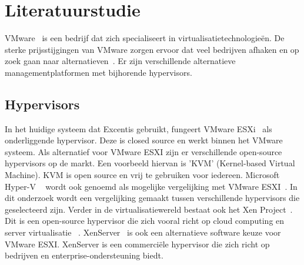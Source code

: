 




\section{Literatuurstudie}
\label{sec:literatuurstudie}
VMware~\autocite{vmware} is een bedrijf dat zich specialiseert in virtualisatietechnologieën. De sterke prijsstijgingen van VMware zorgen ervoor dat veel bedrijven afhaken en op zoek gaan naar alternatieven~\autocite{Hale2024}. Er zijn verschillende alternatieve managementplatformen met bijhorende hypervisors.

\subsection{Hypervisors}
In het huidige systeem dat Excentis gebruikt, fungeert VMware ESXi~\autocite{vmware} als onderliggende hypervisor. Deze is closed source en werkt binnen het VMware systeem. Als alternatief voor VMware ESXI zijn er verschillende open-source hypervisors op de markt.
Een voorbeeld hiervan is 'KVM' (Kernel-based Virtual Machine)\autocite{KVM}. KVM is open source en vrij te gebruiken voor iedereen\autocite{KVM}. Microsoft Hyper-V ~\autocite{Eaton2019} wordt ook genoemd als mogelijke vergelijking met VMware ESXI~\autocite{fayyad2013benchmarking}. In dit onderzoek wordt een vergelijking gemaakt tussen verschillende hypervisors die geselecteerd zijn.
Verder in de virtualisatiewereld bestaat ook het Xen Project~\autocite{xenproject}. Dit is een open-source hypervisor die zich vooral richt op cloud computing en server virtualisatie ~\autocite{binu2011virtualization}.
XenServer~\autocite{xenserver} is ook een alternatieve software keuze voor VMware ESXI. XenServer is een commerciële hypervisor die zich richt op bedrijven en enterprise-ondersteuning biedt.

